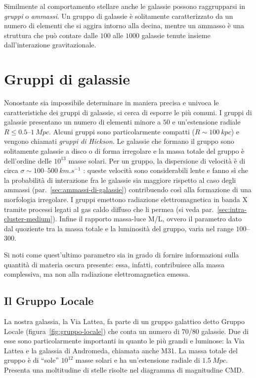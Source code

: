 Similmente al comportamento stellare anche le galassie possono raggrupparsi in \emph{gruppi} o \emph{ammassi}.
Un gruppo di galassie è solitamente caratterizzato da un numero di elementi che si aggira intorno alla decina, mentre un ammasso è una struttura che può contare dalle $100$ alle $1000$ galassie tenute insieme dall’interazione gravitazionale.

\section{Gruppi di galassie}\label{sec:gruppi-di-galassie}
Nonostante sia impossibile determinare in maniera precisa e univoca le caratteristiche dei gruppi di galassie, si cerca di esporre le più comuni. 
I gruppi di galassie presentano un numero di elementi minore a $50$ e un’estensione radiale $R \leq 0.5$--$\SI{1}{Mpc}$. Alcuni gruppi sono particolarmente compatti ($R \sim \SI{100}{kpc}$) e vengono chiamati \emph{gruppi di Hickson}. 
Le galassie che formano il gruppo sono solitamente galassie a disco o di forma irregolare e la massa totale del gruppo è dell’ordine delle $10^{13}$ masse solari. 
Per un gruppo, la dispersione di velocità è di circa $\sigma \sim 100$--$\SI{500}{km.s^{-1}}$ : queste velocità sono considerabili lente e fanno sì che la probabilità di interazione fra le galassie sia maggiore rispetto al caso degli ammassi (par.~\ref{sec:ammassi-di-galassie}) contribuendo così alla formazione di una morfologia irregolare.
I gruppi emettono radiazione elettromagnetica in banda X tramite processi legati al gas caldo diffuso che li permea (si veda par.~\ref{sec:intra-cluster-medium}).
Infine il rapporto massa-luce M/L, ovvero il parametro dato dal quoziente tra la massa totale e la luminosità del gruppo, varia nel range $100$--$300$.

Si noti come quest’ultimo parametro sia in grado di fornire informazioni sulla quantità di materia oscura presente: essa, infatti, contribuisce alla massa complessiva, ma non alla radiazione elettromagnetica emessa. 
\subsection{Il Gruppo Locale}
La nostra galassia, la Via Lattea, fa parte di un gruppo galattico detto Gruppo Locale (figura~\ref{fig:gruppo-locale}) che conta un numero di $70$/$80$ galassie. Due di esse sono particolarmente importanti in quanto le più grandi e luminose: la Via Lattea e la galassia di Andromeda, chiamata anche M31.
La massa totale del gruppo è di “sole” $10^{12}$ masse solari e ha un’estensione radiale di $\SI{1.5}{Mpc}$.
Presenta una moltitudine di stelle risolte nel diagramma di magnitudine CMD.

